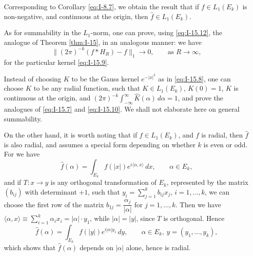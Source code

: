 Corresponding to Corollary \eqref{eq:I-8.7}, we obtain the result that if $f\in L_1(E_k)$ is non-negative, and continuous at the origin, then $\widehat f\in L_1(E_k)$.

As for summability in the $L_1$-norm, one can prove, using \eqref{eq:I-15.12}, the analogue of Theorem \ref{thm:I-15}, in an analogous manner: we have
\begin{equation}\label{eq:I-15.21}\tag{15.21}
\bigl\|(2\pi)^{-k}(f*H_R)-f\bigr\|_1\to 0,\qquad\text{as }R\to\infty,
\end{equation}
for the particular kernel \eqref{eq:I-15.9}.

Instead of choosing $K$ to be the Gauss kernel $e^{-|x|^{2}}$ as in \eqref{eq:I-15.8}, one can choose $K$ to be any radial function, such that $K\in L_1(E_k)$, $K(0)=1$, $K$ is continuous at the origin, and $(2\pi)^{-k}\int_{-\infty}^{\infty}\widehat K(\alpha)\,d\alpha=1$, and prove the analogues of \eqref{eq:I-15.7} and \eqref{eq:I-15.10}. We shall not elaborate here on general summability.

On the other hand, it is worth noting that if $f\in L_1(E_k)$, and $f$ is radial, then $\widehat f$ is also radial, and assumes a special form depending on whether $k$ is even or odd. For we have
\begin{equation}\label{eq:I-15.22}\tag{15.22}
\widehat f(\alpha)=\int_{E_k}f(|x|)e^{i\langle\alpha,x\rangle}\,dx,\qquad\alpha\in E_k,
\end{equation}
and if $T\colon x\to y$ is any orthogonal transformation of $E_k$, represented by the matrix $(b_{ij})$ with determinant $+1$, such that $y_i=\sum_{j=1}^{k}b_{ij}x_j$, $i=1,\ldots,k$, we can choose the first row of the matrix $b_{1j}=\dfrac{\alpha_j}{|\alpha|}$ for $j=1,\ldots,k$. Then we have $\langle\alpha,x\rangle\equiv\sum_{i=1}^{k}\alpha_ix_i=|\alpha|\cdot y_1$, while $|\alpha|=|y|$, since $T$ is orthogonal. Hence
\begin{equation*}
\widehat f(\alpha)=\int_{E_k}f(|y|)e^{i|\alpha|y_1}\,dy,\qquad\alpha\in E_k,\ y=(y_1,\ldots,y_k),
\end{equation*}
which shows that $\widehat f(\alpha)$ depends on $|\alpha|$ alone, hence is radial.

